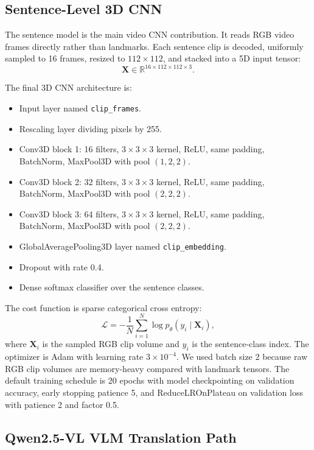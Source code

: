 \documentclass[10pt,twocolumn,letterpaper]{article}
\begin{document}
\subsection{Sentence-Level 3D CNN}

The sentence model is the main video CNN contribution. It reads RGB video frames directly rather than landmarks. Each sentence clip is decoded, uniformly sampled to 16 frames, resized to $112 \times 112$, and stacked into a 5D input tensor:
\[
\mathbf{X} \in \mathbb{R}^{16 \times 112 \times 112 \times 3}.
\]

The final 3D CNN architecture is:
\begin{itemize}
    \item Input layer named \texttt{clip\_frames}.
    \item Rescaling layer dividing pixels by 255.
    \item Conv3D block 1: 16 filters, $3 \times 3 \times 3$ kernel, ReLU, same padding, BatchNorm, MaxPool3D with pool $(1,2,2)$.
    \item Conv3D block 2: 32 filters, $3 \times 3 \times 3$ kernel, ReLU, same padding, BatchNorm, MaxPool3D with pool $(2,2,2)$.
    \item Conv3D block 3: 64 filters, $3 \times 3 \times 3$ kernel, ReLU, same padding, BatchNorm, MaxPool3D with pool $(2,2,2)$.
    \item GlobalAveragePooling3D layer named \texttt{clip\_embedding}.
    \item Dropout with rate 0.4.
    \item Dense softmax classifier over the sentence classes.
\end{itemize}

The cost function is sparse categorical cross entropy:
\[
\mathcal{L} = -\frac{1}{N}\sum_{i=1}^{N}\log p_\theta(y_i \mid \mathbf{X}_i),
\]
where $\mathbf{X}_i$ is the sampled RGB clip volume and $y_i$ is the sentence-class index. The optimizer is Adam \cite{kingma2015adam} with learning rate $3 \times 10^{-4}$. We used batch size 2 because raw RGB clip volumes are memory-heavy compared with landmark tensors. The default training schedule is 20 epochs with model checkpointing on validation accuracy, early stopping patience 5, and ReduceLROnPlateau on validation loss with patience 2 and factor 0.5.

\subsection{Qwen2.5-VL VLM Translation Path}
\end{document}
